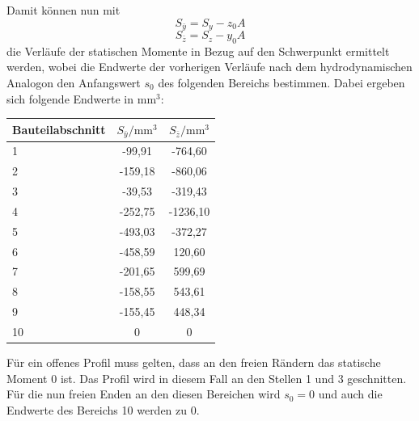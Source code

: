 Damit können nun mit
\begin{equation}
	S_{\bar{y}}=S_y-z_0A
\end{equation} 
\begin{equation}
S_{\bar{z}}=S_z-y_0A
\end{equation} 
die Verläufe der statischen Momente in Bezug auf den Schwerpunkt ermittelt werden, wobei die Endwerte der vorherigen Verläufe nach dem hydrodynamischen Analogon den Anfangswert $s_0$ des folgenden Bereichs bestimmen. Dabei ergeben sich folgende Endwerte in $\mathrm{mm}^3$:
\begin{center}
\begin{tabular}[h]{l|c|c}
Bauteilabschnitt&$S_{\bar{y}}/\mathrm{mm}^3$&$S_{\bar{z}}/\mathrm{mm}^3$\\
\hline
1&-99,91&-764,60\\
2&-159,18&-860,06\\
3&-39,53&-319,43\\
4&-252,75&-1236,10\\
5&-493,03&-372,27\\
6&-458,59&120,60\\
7&-201,65&599,69\\
8&-158,55&543,61\\
9&-155,45&448,34\\
10&0&0\\
\end{tabular}
\end{center}
Für ein offenes Profil muss gelten, dass an den freien Rändern das statische Moment $ 0 $ ist. Das Profil wird in diesem Fall an den Stellen 1 und 3 geschnitten. Für die nun freien Enden an den diesen Bereichen wird $s_0=0$ und auch die Endwerte des Bereichs 10 werden zu $0$.

